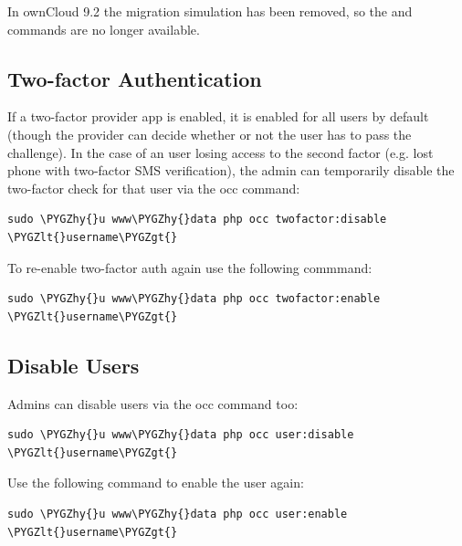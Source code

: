 \documentclass[letterpaper,10pt,english]{sphinxmanual}
\def\PYGZlt{\char`\<}
\def\PYGZgt{\char`\>}
\def\PYGZhy{\char`\-}
\begin{document}
In ownCloud 9.2 the migration simulation has been removed, so the  and  commands are no longer available.


\subsection{Two-factor Authentication}
\label{configuration_server/occ_command:two-factor-auth-label}\label{configuration_server/occ_command:two-factor-authentication}
If a two-factor provider app is enabled, it is enabled for all users by default
(though the provider can decide whether or not the user has to pass the challenge).
In the case of an user losing access to the second factor (e.g. lost phone with
two-factor SMS verification), the admin can temporarily disable the two-factor
check for that user via the occ command:

\begin{Verbatim}[commandchars=\\\{\}]
sudo \PYGZhy{}u www\PYGZhy{}data php occ twofactor:disable \PYGZlt{}username\PYGZgt{}
\end{Verbatim}

To re-enable two-factor auth again use the following commmand:

\begin{Verbatim}[commandchars=\\\{\}]
sudo \PYGZhy{}u www\PYGZhy{}data php occ twofactor:enable \PYGZlt{}username\PYGZgt{}
\end{Verbatim}


\subsection{Disable Users}
\label{configuration_server/occ_command:disable-users}\label{configuration_server/occ_command:disable-user-label}
Admins can disable users via the occ command too:

\begin{Verbatim}[commandchars=\\\{\}]
sudo \PYGZhy{}u www\PYGZhy{}data php occ user:disable \PYGZlt{}username\PYGZgt{}
\end{Verbatim}

Use the following command to enable the user again:

\begin{Verbatim}[commandchars=\\\{\}]
sudo \PYGZhy{}u www\PYGZhy{}data php occ user:enable \PYGZlt{}username\PYGZgt{}
\end{Verbatim}
\end{document}
